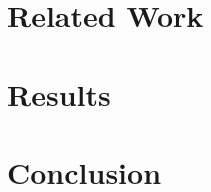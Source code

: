 \documentclass{article}
\begin{document}
\section{Related Work}
\label{sec:related}





\section{Results}
\label{sec:results}





\section{Conclusion}
\label{sec:conclusion}




\end{document}
